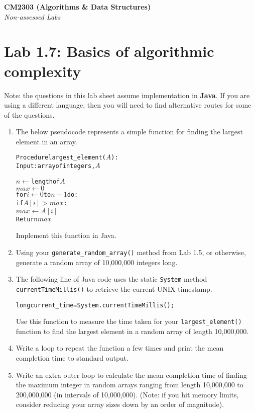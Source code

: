 \documentclass[11pt,a4paper]{report}
\begin{document}
\noindent\Large\textbf{CM2303 (Algorithms \& Data Structures)}\\
\noindent\large\textit{Non-assessed Labs}
\vskip30pt

\section*{Lab 1.7: Basics of algorithmic complexity}

Note: the questions in this lab sheet assume implementation in \textbf{Java}. If you are using a different language, then you will need to find alternative routes for some of the questions.

\begin{enumerate}

    \item The below pseudocode represents a simple function for finding the largest element in an array.
\begin{alltt}
Procedure largest_element(\(A\)):
    Input:  array of integers, \(A\)

    \(n \gets \) length of \(A\)
    \(max \gets 0\)
    for \(i \gets 0\) to \(n - 1\) do:
        if \(A[i] > max\):
            \(max \gets A[i]\)
    Return \(max\)
\end{alltt}
    \vskip10pt
    Implement this function in Java.

    \item Using your \texttt{generate\_random\_array()} method from Lab 1.5, or otherwise, generate a random array of 10,000,000 integers long. 

    \item The following line of Java code uses the static \texttt{System} method \texttt{currentTimeMillis()} to retrieve the current UNIX timestamp.
\begin{alltt}
long current_time = System.currentTimeMillis();
\end{alltt}
    Use this function to measure the time taken for your \texttt{largest\_element()} function to find the largest element in a random array of length 10,000,000.

    \item Write a loop to repeat the function a few times and print the mean completion time to standard output.

    \item Write an extra outer loop to calculate the mean completion time of finding the maximum integer in random arrays ranging from length 10,000,000 to 200,000,000 (in intervals of 10,000,000). (Note: if you hit memory limits, consider reducing your array sizes down by an order of magnitude).


\end{enumerate}
\end{document}
